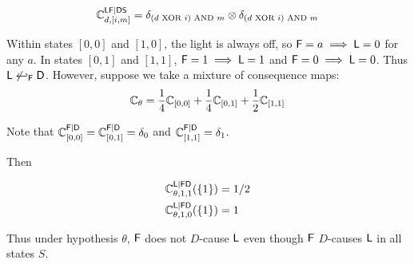 \begin{align}
    \mathbb{C}^{\mathsf{L}\mathsf{F}|\mathsf{D}\mathsf{S}}_{d,[i,m]} = \delta_{(d\text{ XOR }i)\text{ AND }m}\otimes \delta_{(d\text{ XOR }i)\text{ AND }m}
\end{align}

Within states $[0,0]$ and $[1,0]$, the light is always off, so $\mathsf{F}=a\implies \mathsf{L}=0$ for any $a$. In states $[0,1]$ and $[1,1]$, $\mathsf{F}=1\implies \mathsf{L}=1$ and $\mathsf{F}=0\implies \mathsf{L}=0$. Thus $\mathsf{L}\not\hookleftarrow_{\mathsf{F}} \mathsf{D}$. However, suppose we take a mixture of consequence maps:
\begin{align}
    \mathbb{C}_\theta = \frac{1}{4}\mathbb{C}_{[0,0]} + \frac{1}{4}\mathbb{C}_{[0,1]} + \frac{1}{2}\mathbb{C}_{[1,1]}
\end{align}

Note that $\mathbb{C}^{\mathsf{F}|\mathsf{D}}_{[0,0]}=\mathbb{C}^{\mathsf{F}|\mathsf{D}}_{[0,1]} = \delta_0$ and $\mathbb{C}^{\mathsf{F}|\mathsf{D}}_{[1,1]}=\delta_1$.

Then

\begin{align}
    \mathbb{C}^{\mathsf{L}|\mathsf{F}\mathsf{D}}_{\theta,1,1}(\{1\}) &= 1/2\\
    \mathbb{C}^{\mathsf{L}|\mathsf{F}\mathsf{D}}_{\theta,1,0}(\{1\}) &= 1
\end{align}

Thus under hypothesis $\theta$, $\mathsf{F}$ does not $D$-cause $\mathsf{L}$ even though $\mathsf{F}$ $D$-causes $\mathsf{L}$ in all states $S$.